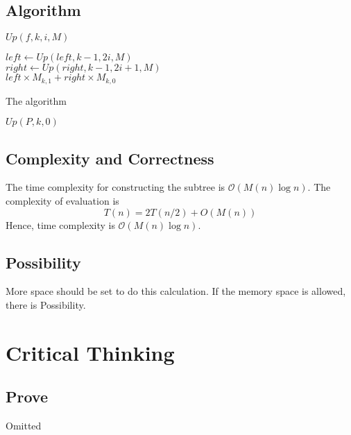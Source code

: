 \documentclass[12pt,a4paper]{article}
\theoremstyle{definition}
\begin{document}
\subsection{Algorithm}
\begin{algorithm*}[H]
  \caption{$Up(f,k,i,M)$}
    $left \gets Up(left,k-1,2i,M)$ \\ 
    $right \gets Up(right,k-1,2i+1,M)$ \\ 
    \Return $left\times M_{k,1} + right \times M_{k,0}$
\end{algorithm*}
\begin{algorithm*}[H]
  \caption{The algorithm}
  \Return $Up(P,k,0)$
\end{algorithm*}
\subsection{Complexity and Correctness}
The time complexity for constructing the subtree is $\mathcal{O}(M(n)\log n)$. The complexity of evaluation is 
$$
  T(n)= 2 T(n/2) + O(M(n))
$$
Hence, time complexity is $\mathcal{O}(M(n)\log n)$.
\subsection{Possibility}
More space should be set to do this calculation. If the memory space is allowed, there is Possibility.
\section{Critical Thinking}
\subsection{Prove}
Omitted
\end{document}
